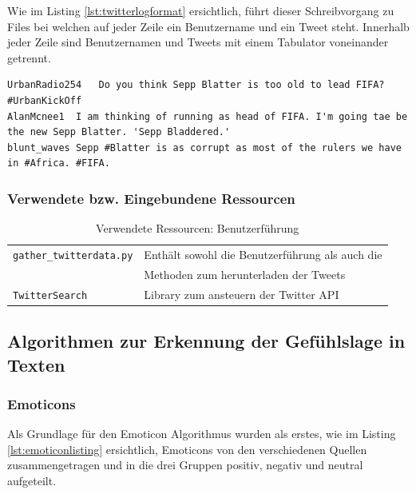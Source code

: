 Wie im Listing \ref{lst:twitterlogformat} ersichtlich, führt dieser Schreibvorgang zu Files bei welchen auf jeder Zeile ein Benutzername und ein Tweet steht. Innerhalb jeder Zeile sind Benutzernamen und Tweets mit einem Tabulator voneinander getrennt.

\begin{lstlisting}[showtabs=true, caption={Twitter Logfile Format)}, label={lst:twitterlogformat}]
UrbanRadio254	Do you think Sepp Blatter is too old to lead FIFA? #UrbanKickOff
AlanMcnee1	I am thinking of running as head of FIFA. I'm going tae be the new Sepp Blatter. 'Sepp Bladdered.'
blunt_waves	Sepp #Blatter is as corrupt as most of the rulers we have in #Africa. #FIFA.
\end{lstlisting}

\subsubsection{Verwendete bzw. Eingebundene Ressourcen}
\begin{table}[H]
\begin{center}
\begin{tabular}{|l|l|}
	\hline
	\lstinline$gather_twitterdata.py$ & Enthält sowohl die Benutzerführung als auch die\\
	& Methoden zum herunterladen der Tweets \\ \hline
	\lstinline$TwitterSearch$ & Library zum ansteuern der Twitter API\\ \hline
\end{tabular}
\caption{Verwendete Ressourcen: Benutzerführung}
\end{center}
\end{table}

\subsection{Algorithmen zur Erkennung der Gefühlslage in Texten}
\subsubsection{Emoticons}
Als Grundlage für den Emoticon Algorithmus wurden als erstes, wie im Listing \ref{lst:emoticonlisting} ersichtlich, Emoticons von den verschiedenen Quellen \cite{emoticons1}\cite{emoticons2}\cite{emoticons3}\cite{emoticons4} zusammengetragen und in die drei Gruppen positiv, negativ und neutral aufgeteilt.

